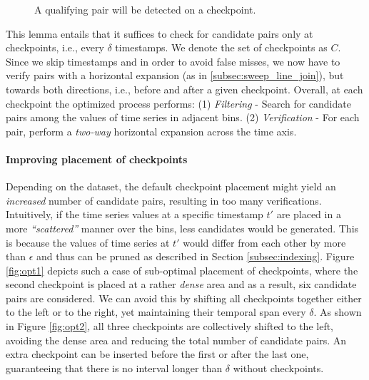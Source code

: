 \begin{figure}[!tb]
 \centering
 \caption{A qualifying pair will be detected on a checkpoint.}
 \label{fig:proof}
\end{figure}

This lemma entails that it suffices to check for candidate pairs only at checkpoints, i.e., every $\delta$ timestamps. We denote the set of checkpoints as $C$. Since we skip timestamps and in order to avoid false misses, we now have to verify pairs with a horizontal expansion (as in \ref{subsec:sweep_line_join}), but towards both directions, i.e., before and after a given checkpoint. Overall, at each checkpoint the optimized process performs: (1) \textit{Filtering} - Search for candidate pairs among the values of time series in adjacent bins. (2) \textit{Verification} - For each pair, perform a \textit{two-way} horizontal expansion across the time axis.

\paragraph{Improving placement of checkpoints} Depending on the dataset, the default checkpoint placement might yield an \textit{increased} number of candidate pairs, resulting in too many verifications. Intuitively, if the time series values at a specific timestamp $t'$ are placed in a more \textit{``scattered''} manner over the bins, less candidates would be generated. This is because the values of time series at $t'$ would differ from each other by more than $\epsilon$ and thus can be pruned as described in Section \ref{subsec:indexing}. Figure \ref{fig:opt1} depicts such a case of sub-optimal placement of checkpoints, where the second checkpoint is placed at a rather \textit{dense} area and as a result, six candidate pairs are considered. We can avoid this by shifting all checkpoints together either to the left or to the right, yet maintaining their temporal span every $\delta$. As shown in Figure \ref{fig:opt2}, all three checkpoints are collectively shifted to the left, avoiding the dense area and reducing the total number of candidate pairs. An extra checkpoint can be inserted before the first or after the last one, guaranteeing that there is no interval longer than $\delta$ without checkpoints.

